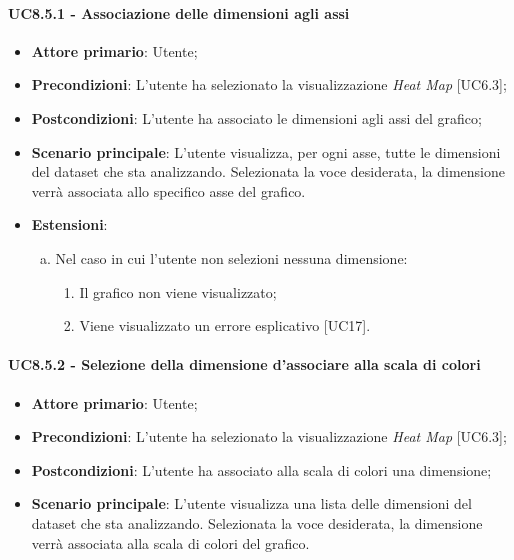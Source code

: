 \paragraph{UC8.5.1 - Associazione delle dimensioni agli assi}
\begin{itemize}
	\item \textbf{Attore primario}: Utente;
	\item \textbf{Precondizioni}: L'utente ha selezionato la visualizzazione \textit{Heat Map} [UC6.3];
	\item \textbf{Postcondizioni}: L'utente ha associato le dimensioni agli assi del grafico;
	
	\item \textbf{Scenario principale}: L'utente visualizza, per ogni asse, tutte le dimensioni del dataset che sta analizzando. Selezionata la voce desiderata, la dimensione verrà associata allo specifico asse del grafico. 
	\item \textbf{Estensioni}:
	\begin{enumerate}[(a)]
		\item Nel caso in cui l'utente non selezioni nessuna dimensione:
		\begin{enumerate}[1.]
			\item Il grafico non viene visualizzato;
			\item Viene visualizzato un errore esplicativo [UC17].
		\end{enumerate}
	\end{enumerate}
\end{itemize}

\paragraph{UC8.5.2 - Selezione della dimensione d'associare alla scala di colori}
\begin{itemize}
	\item \textbf{Attore primario}: Utente;
	\item \textbf{Precondizioni}: L'utente ha selezionato la visualizzazione \textit{Heat Map} [UC6.3];
	\item \textbf{Postcondizioni}: L'utente ha associato alla scala di colori una dimensione;
	
	\item \textbf{Scenario principale}: L'utente visualizza una lista delle dimensioni del dataset che sta analizzando. Selezionata la voce desiderata, la dimensione verrà associata alla scala di colori del grafico. 
\end{itemize}